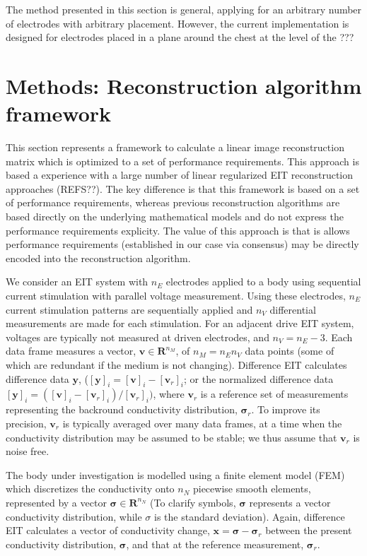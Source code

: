 \documentclass[12pt]{iopart}
\newcommand{\mathbb}{\mathbf}
\newcommand{\vB}{\mbox{$\mathbf{v}$}}
\newcommand{\xB}{\mbox{$\mathbf{x}$}}
\newcommand{\yB}{\mbox{$\mathbf{y}$}}
\newcommand{\sG}{\mbox{${\mathbf \sigma}$}}
\begin{document}
The method presented in this section is general,
applying for an arbitrary number of electrodes  with 
arbitrary placement. However, the current implementation
is designed for electrodes placed in a plane around the
chest at the level of the ???

\section{Methods: Reconstruction algorithm framework}

This section represents a framework to calculate
a linear image reconstruction matrix which is optimized
to a set of performance requirements. This approach
is based a experience with a large number of 
linear regularized EIT reconstruction approaches
(REFS??). The key difference is that this framework
is based on a set of performance requirements, whereas
previous reconstruction algorithms are based directly on
the underlying mathematical models and do not express
the performance requirements explicity.
The value of this approach is that is allows
performance requirements (established in our case
via consensus) may be directly encoded into the
reconstruction algorithm.

We consider an EIT system with $n_E$ electrodes applied to a body
using sequential current stimulation with parallel voltage
measurement. Using these electrodes, $n_E$ current stimulation
patterns are sequentially applied and $n_V$ differential
measurements are made for each stimulation.  For an adjacent drive
EIT system, voltages are typically not measured at driven
electrodes, and $n_V = n_E - 3$.  Each data frame measures
a vector, $\vB\in\mathbb{R}^{n_M}$, of $n_M= n_E n_V$ data points
(some of which are redundant if the medium is not changing).
Difference EIT calculates difference data $\yB$, ($[\yB]_i =
[\vB]_i - [\vB_r]_i$; or the normalized difference data $[\yB]_i
= ([\vB]_i - [\vB_r]_i)/[\vB_r]_i)$, where $\vB_r$ is a reference
set of measurements representing the backround conductivity
distribution, $\sG_r$. To improve its precision,
$\vB_r$ is typically averaged over many data frames, at a time
when the conductivity distribution may be assumed to be stable;
 we thus assume that $\vB_r$ is noise free.

The body under investigation is modelled using a finite element
model (FEM) which discretizes the conductivity onto $n_N$
piecewise smooth elements, represented by a vector
$\sG\in\mathbb{R}^{n_N}$ (To clarify symbols,
$\sG$ represents a vector conductivity distribution, while
$\sigma$ is the standard deviation).
Again, difference EIT calculates a vector of
conductivity change, $\xB = \sG - \sG_r$ between the present
conductivity distribution, $\sG$, and that at the reference
measurement, $\sG_r$.
\end{document}
